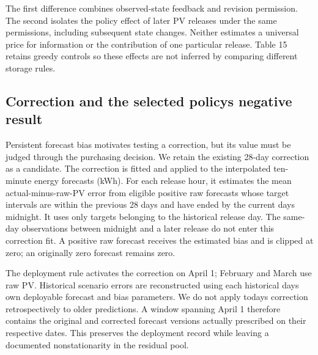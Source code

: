 The first difference combines observed-state feedback and revision permission. The second isolates the policy effect of later PV releases under the same permissions, including subsequent state changes. Neither estimates a universal price for information or the contribution of one particular release. Table 15 retains greedy controls so these effects are not inferred by comparing different storage rules.

\par
\endgroup

\subsection{Correction and the selected policy\textquotesingle s negative result}\label{correction-and-the-selected-policys-negative-result}

Persistent forecast bias motivates testing a correction, but its value must be judged through the purchasing decision. We retain the existing 28-day correction as a candidate. The correction is fitted and applied to the interpolated ten-minute energy forecasts (kWh). For each release hour, it estimates the mean actual-minus-raw-PV error from eligible positive raw forecasts whose target intervals are within the previous 28 days and have ended by the current day\textquotesingle s midnight. It uses only targets belonging to the historical release day. The same-day observations between midnight and a later release do not enter this correction fit. A positive raw forecast receives the estimated bias and is clipped at zero; an originally zero forecast remains zero.

The deployment rule activates the correction on April 1; February and March use raw PV. Historical scenario errors are reconstructed using each historical day\textquotesingle s own deployable forecast and bias parameters. We do not apply today\textquotesingle s correction retrospectively to older predictions. A window spanning April 1 therefore contains the original and corrected forecast versions actually prescribed on their respective dates. This preserves the deployment record while leaving a documented nonstationarity in the residual pool.

\Needspace{85.0pt}
\begingroup
\fontsize{9.0}{10.8}\selectfont
\setlength{\tabcolsep}{3.2pt}
\renewcommand{\arraystretch}{1.12}
\setlength{\LTleft}{0pt plus 1fill}\setlength{\LTright}{0pt plus 1fill}
\setlength{\LTcapwidth}{\linewidth}

